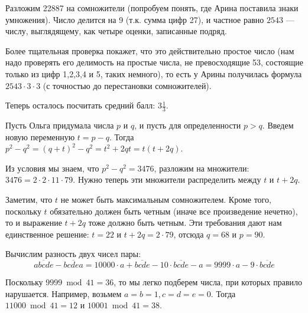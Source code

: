 ﻿
\begin{itemize}
\itA Разложим 22887 на сомножители (попробуем понять, где Арина поставила знаки умножения). 
Число делится на 9 (т.к. сумма цифр 27), и
частное равно $2543$ --- числу, выглядящему, как четыре оценки, записанные подряд.

Более тщательная проверка покажет, что это действительно простое число (нам надо проверять его
делимость на простые числа, не превосходящие 53, состоящие только из цифр 1,2,3,4 и 5, таких немного),
то есть у Арины получилась формула $2543 \cdot 3 \cdot 3$ (с точностью до перестановки сомножителей).

Теперь осталось посчитать средний балл: $3\frac{1}{3}$.

\itB Пусть Ольга придумала числа $p$ и $q$, и пусть для определенности $p > q$. Введем новую
переменную $t = p - q$. Тогда $p^2 - q^2 = (q + t)^2 - q^2 = t^2 + 2qt = t(t + 2q)$.

Из условия мы знаем, что $p^2 - q^2 = 3476$, разложим на множители: 
$3476 = 2\cdot 2\cdot 11 \cdot 79$. 
Нужно теперь эти множители распределить между $t$ и $t+2q$. 

Заметим, что $t$ не может быть максимальным сомножителем. Кроме того, поскольку $t$ обязательно 
должен быть четным (иначе все произведение нечетно), то и выражение $t+2q$ тоже должно быть
четным. Эти требования дают нам единственное решение: $t = 22$ и $t + 2q = 2 \cdot 79$,
отсюда $q = 68$ и $p = 90$.

\itC 

Вычислим разность двух чисел пары:
$$\overline{abcde} - \overline{bcdea} = 10000\cdot a + \overline{bcde} - 10\cdot\overline{bcde} - a = 9999\cdot a - 9 \cdot\overline{bcde}$$

Поскольку $9999 \bmod 41 = 36$, то мы легко подберем числа, при которых правило нарушается.
Например, возьмем $a = b = 1, c = d = e = 0$. Тогда $11000 \bmod 41 = 12$ и $10001 \bmod 41 = 38$.

\end{itemize}
